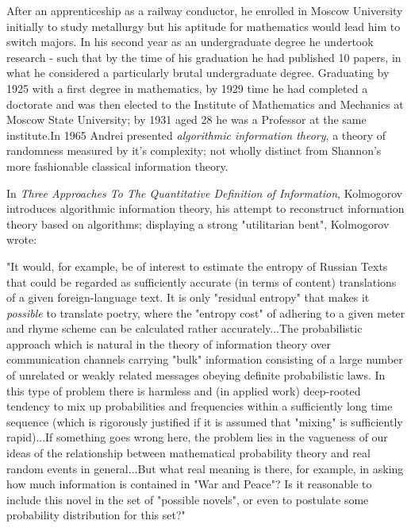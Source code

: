 \documentclass[7pt]{article}
\begin{document}
 After an apprenticeship as a railway conductor, he enrolled in Moscow University initially to study metallurgy but his aptitude for mathematics would lead him to switch majors. In his second year as an undergraduate degree he undertook research - such that by the time of his graduation he had published 10 papers, in what he considered a particularly brutal undergraduate degree. Graduating by 1925 with a first degree in mathematics, by 1929 time he had completed a doctorate and was then elected to the Institute of Mathematics and Mechanics at Moscow State University; by 1931 aged 28 he was a Professor at the same institute.In 1965 Andrei presented \textit{algorithmic information theory}, a theory of randomness measured by it's complexity; not wholly distinct from Shannon's more fashionable classical information theory. 
 

In \textit{Three Approaches To The Quantitative Definition of Information}, Kolmogorov introduces algorithmic information theory, his attempt to reconstruct information theory based on algorithms; displaying a strong "utilitarian bent", Kolmogorov wrote: 

\vspace{0.5cm}
\relax
{}\relax

	"It would, for example, be of interest to estimate the entropy of Russian Texts that could be regarded as sufficiently accurate (in terms of content) translations of a given foreign-language text. It is only "residual entropy" that makes it \textit{possible} to translate poetry, where the "entropy cost" of adhering to a given meter and rhyme scheme can be calculated rather accurately...The probabilistic approach which is natural in the theory of information theory over communication channels carrying "bulk" information consisting of a large number of unrelated or weakly related messages obeying definite probabilistic laws. In this type of problem there is harmless and (in applied work) deep-rooted tendency to mix up probabilities and frequencies within a sufficiently long time sequence (which is rigorously justified if it is assumed that "mixing" is sufficiently rapid)...If something goes wrong here, the problem lies in the vagueness of our ideas of the relationship between mathematical probability theory and real random events in general...But what real meaning is there, for example, in asking how much information is contained in "War and Peace"? Is it reasonable to include  this novel in the set of "possible novels", or even to postulate some probability distribution for this set?"
\end{document}

